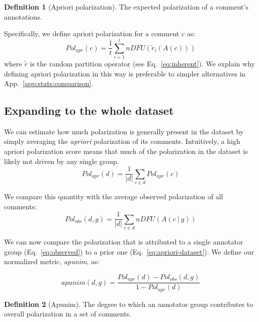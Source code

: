 \documentclass{article} %
\theoremstyle{definition}
\newtheorem{definition}{Definition}
\theoremstyle{plain}
\newcommand\given[1][]{\:#1\vert\:}
\begin{document}
\begin{definition}[Apriori polarization]
	\label{def:apriori}
	The expected polarization of a comment's annotations.
\end{definition}

Specifically, we define apriori polarization for a comment $c$ as:
\begin{equation}
	\label{eq:apriori}
	Pol_{apr}(c) = \frac{1}{t} \sum_{i=1}^t  \textit{nDFU}(\tilde{r}_i (A(c)))
\end{equation}
\noindent where $\tilde{r}$ is the random partition operator (see Eq.~\ref{eq:inherent}). We explain why defining apriori polarization in this way is preferable to simpler alternatives in App.~\ref{app:stats:comparison}.


\subsection{Expanding to the whole dataset}
\label{sec:apunim:dataset}

We can estimate how much polarization is generally present in the dataset by simply averaging the \textit{apriori} polarization of its comments. Intuitively, a high apriori polarization score means that much of the polarization in the dataset is likely not driven by any single group.  
\begin{equation}
	\label{eq:apriori-dataset}
	Pol_{apr}(d) = \frac{1}{\lvert d \rvert} \sum_{c \in d} Pol_{apr}(c)
\end{equation}

We compare this quantity with the average observed polarization of all comments:
\begin{equation}
	\label{eq:observed}
	Pol_{obs}(d, g) = \frac{1}{\lvert d \rvert} \sum_{c \in d}  \textit{nDFU}(A(c \given g))
\end{equation}

We can now compare the polarization that is attributed to a single annotator group (Eq.~\ref{eq:observed}) to a prior one (Eq.~\ref{eq:apriori-dataset}). We define our normalized metric, \emph{apunim}, as:

\begin{equation}
	\label{eq:apunim}
	apunim(d, g) = \frac{Pol_{apr}(d) - Pol_{obs}(d, g)}{1 - Pol_{apr}(d)}
\end{equation}

\begin{definition}[Apunim]
	\label{def:apunim}
	The degree to which an annotator group contributes to overall polarization in a set of comments.
\end{definition}
\end{document}

